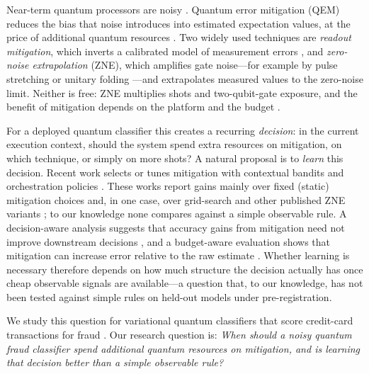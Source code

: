\documentclass[11pt]{article}
\begin{document}
Near-term quantum processors are noisy \citep{preskill2018quantum}.
Quantum error mitigation (QEM) reduces the bias that noise introduces into estimated expectation values, at the price of additional quantum resources \citep{temme2017error,kandala2019error,cai2023quantum}.
Two widely used techniques are \emph{readout mitigation}, which inverts a calibrated model of measurement errors \citep{bravyi2021mitigating,maciejewski2020mitigation}, and \emph{zero-noise extrapolation} (ZNE), which amplifies gate noise---for example by pulse stretching \citep{kim2023scalable} or unitary folding \citep{giurgicatiron2020digital}---and extrapolates measured values to the zero-noise limit.
Neither is free: ZNE multiplies shots and two-qubit-gate exposure, and the benefit of mitigation depends on the platform and the budget \citep{russo2023testing,zhang2026worse}.

For a deployed quantum classifier this creates a recurring \emph{decision}: in the current execution context, should the system spend extra resources on mitigation, on which technique, or simply on more shots?
A natural proposal is to \emph{learn} this decision.
Recent work selects or tunes mitigation with contextual bandits and orchestration policies \citep{szachara2026gsc,rahman2026adaptive,majid2026context}.
These works report gains mainly over fixed (static) mitigation choices and, in one case, over grid-search and other published ZNE variants \citep{rahman2026adaptive}; to our knowledge none compares against a simple observable rule.
A decision-aware analysis suggests that accuracy gains from mitigation need not improve downstream decisions \citep{scavino2026decision}, and a budget-aware evaluation shows that mitigation can increase error relative to the raw estimate \citep{zhang2026worse}.
Whether learning is necessary therefore depends on how much structure the decision actually has once cheap observable signals are available---a question that, to our knowledge, has not been tested against simple rules on held-out models under pre-registration.

We study this question for variational quantum classifiers \citep{havlicek2019supervised,schuld2020circuit} that score credit-card transactions for fraud \citep{dalpozzolo2015calibrating,mlgulb2018creditcardfraud}.
Our research question is: \emph{When should a noisy quantum fraud classifier spend additional quantum resources on mitigation, and is learning that decision better than a simple observable rule?}
\end{document}
